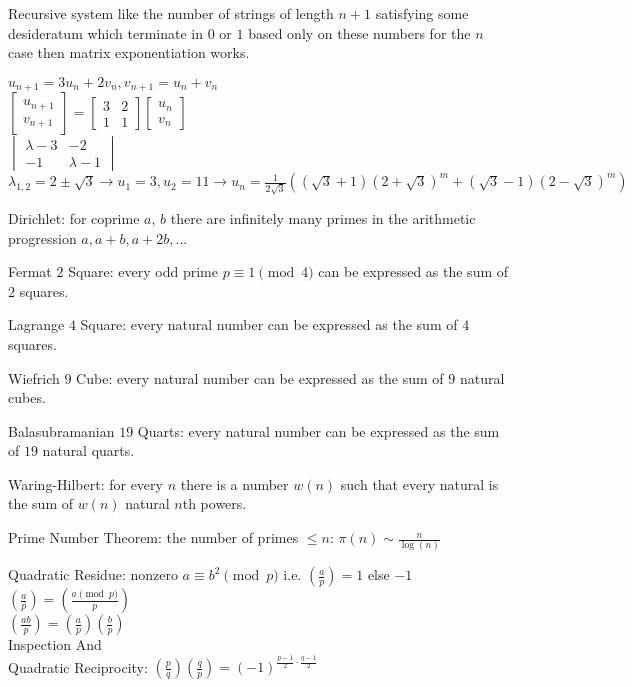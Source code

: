 Recursive system like the number of strings of length $n+1$ satisfying some desideratum which terminate in $0$ or $1$ based only on these numbers for the $n$ case then matrix exponentiation works.

$u_{n+1}=3u_n+2v_n,v_{n+1}=u_n+v_n$ \\
$\begin{bmatrix} u_{n+1} \\ v_{n+1} \end{bmatrix} = \begin{bmatrix} 3 & 2 \\ 1 & 1 \end{bmatrix} \begin{bmatrix} u_n \\ v_n \end{bmatrix}$ \\
$\begin{vmatrix} \lambda-3 & -2 \\ -1 & \lambda-1 \end{vmatrix}$ \\
$\lambda_{1,2}=2 \pm \sqrt{3} \to u_1=3, u_2=11 \to u_n = \frac{1}{2 \sqrt{3}} ((\sqrt{3}+1)(2+\sqrt{3})^m+(\sqrt{3}-1)(2-\sqrt{3})^m)$

Dirichlet: for coprime $a$, $b$ there are infinitely many primes in the arithmetic progression $a,a+b,a+2b,\dots$

Fermat $2$ Square: every odd prime $p \equiv 1 \pmod{4}$ can be expressed as the sum of $2$ squares.

Lagrange $4$ Square: every natural number can be expressed as the sum of $4$ squares.

Wiefrich $9$ Cube: every natural number can be expressed as the sum of $9$ natural cubes.

Balasubramanian $19$ Quarts: every natural number can be expressed as the sum of $19$ natural quarts.

Waring-Hilbert: for every $n$ there is a number $w(n)$ such that every natural is the sum of $w(n)$ natural $n$th powers.

Prime Number Theorem: the number of primes $\le n$: $\pi (n) \sim \frac{n}{\log(n)}$

Quadratic Residue: nonzero $a \equiv b^2 \pmod{p}$ i.e. $\left(\frac{a}{p} \right) = 1$ else $-1$ \\
$\left(\frac{a}{p} \right) = \left(\frac{a \pmod{p}}{p} \right)$ \\
$\left(\frac{ab}{p} \right) = \left(\frac{a}{p} \right) \left(\frac{b}{p} \right)$ \\
Inspection And \\
Quadratic Reciprocity: $\left(\frac{p}{q} \right) \left(\frac{q}{p} \right) = (-1)^{\frac{p-1}{2} \cdot \frac{q-1}{2}}$

